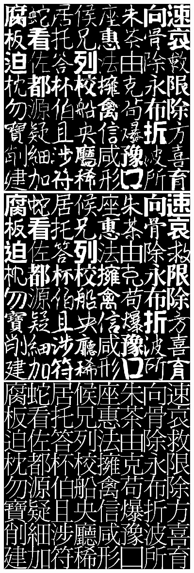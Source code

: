 \documentclass[10pt,twocolumn,letterpaper]{article}
\begin{document}
\begin{figure}[t]
	\begin{center}
		\includegraphics[width=0.8\linewidth]{380gen.png}
		\includegraphics[width=0.8\linewidth]{380gt.png}
		\includegraphics[width=0.8\linewidth]{380r1.png}

\end{center}
\end{figure}
\end{document}
